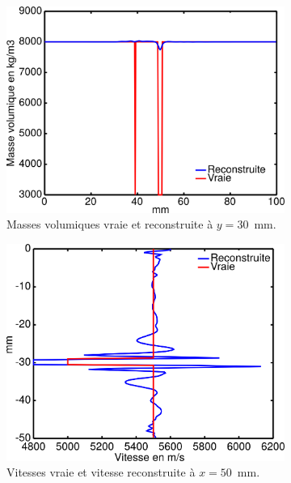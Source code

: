 \begin{figure}[p]
\begin{changemargin}{-2cm}{-2cm}
\begin{subfigure}[b]{0.29\textwidth}
			\includegraphics[width=\textwidth]{img/mono_param/coupe_rho_mono.png}
			\caption{Masses volumiques vraie et reconstruite à $y=30$~mm.}
		\end{subfigure}
				\begin{subfigure}[b]{0.29\textwidth}
			\includegraphics[width=\textwidth]{img/mono_param/coupe_vp_mono_uni_vert.png}
			\caption{Vitesses vraie et vitesse reconstruite à $x=50$~mm.}
		\end{subfigure}
		\begin{subfigure}[b]{0.29\textwidth}

\end{subfigure}
\end{changemargin}
\end{figure}
